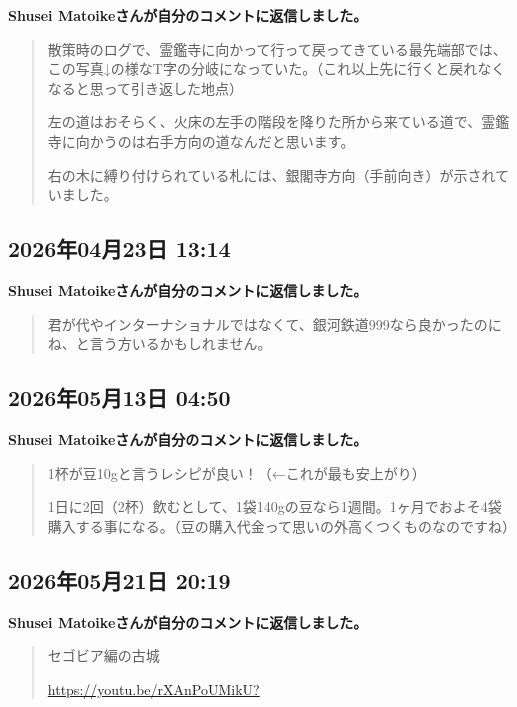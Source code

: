 \textbf{Shusei Matoikeさんが自分のコメントに返信しました。}

\begin{quote}
散策時のログで、霊鑑寺に向かって行って戻ってきている最先端部では、この写真↓の様なT字の分岐になっていた。（これ以上先に行くと戻れなくなると思って引き返した地点）

左の道はおそらく、火床の左手の階段を降りた所から来ている道で、霊鑑寺に向かうのは右手方向の道なんだと思います。

右の木に縛り付けられている札には、銀閣寺方向（手前向き）が示されていました。
\end{quote}

\subsection*{2026年04月23日 13:14}

\textbf{Shusei Matoikeさんが自分のコメントに返信しました。}

\begin{quote}
君が代やインターナショナルではなくて、銀河鉄道999なら良かったのにね、と言う方いるかもしれません。
\end{quote}

\subsection*{2026年05月13日 04:50}

\textbf{Shusei Matoikeさんが自分のコメントに返信しました。}

\begin{quote}
1杯が豆10gと言うレシピが良い！（←これが最も安上がり）

1日に2回（2杯）飲むとして、1袋140gの豆なら1週間。1ヶ月でおよそ4袋購入する事になる。（豆の購入代金って思いの外高くつくものなのですね）
\end{quote}

\subsection*{2026年05月21日 20:19}

\textbf{Shusei Matoikeさんが自分のコメントに返信しました。}

\begin{quote}
セゴビア編の古城

\url{https://youtu.be/rXAnPoUMikU?}
\end{quote}

